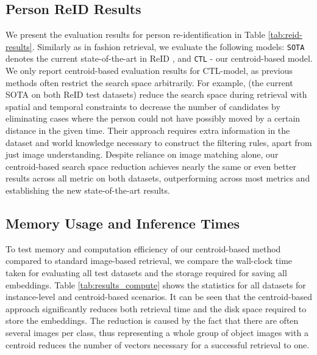 \documentclass[sigconf,nonacm]{acmart}
\begin{document}
\subsection{Person ReID Results}
We present the evaluation results for person re-identification in Table \ref{tab:reid-results}. Similarly as in fashion retrieval, we evaluate the following models: \texttt{SOTA} denotes the current state-of-the-art in ReID \cite{Wang2019_reid_spatial_temporal}, and \texttt{CTL} - our centroid-based model. We only report centroid-based evaluation results for CTL-model, as previous methods often restrict the search space arbitrarily.
For example, \cite{Wang2019_reid_spatial_temporal} (the current SOTA on both ReID test datasets) reduce the search space during retrieval with spatial and temporal constraints to decrease the number of candidates by eliminating cases where the person could not have possibly moved by a certain distance in the given time. Their approach requires extra information in the dataset and world knowledge necessary to construct the filtering rules, apart from just image understanding. Despite reliance on image matching alone, our centroid-based search space reduction achieves nearly the same or even better results across all metric on both datasets, outperforming \cite{Wang2019_reid_spatial_temporal} across most metrics and establishing the new state-of-the-art results.

\subsection{Memory Usage and Inference Times}

To test memory and computation efficiency of our centroid-based method compared to standard image-based retrieval, we compare the wall-clock time taken for evaluating all test datasets and the storage required for saving all embeddings.
Table \ref{tab:results_compute} shows the statistics for all datasets for instance-level and centroid-based scenarios. It can be seen that the centroid-based approach significantly reduces both retrieval time and the disk space required to store the embeddings. The reduction is caused by the fact that there are often several images per class, thus representing a whole group of object images with a centroid reduces the number of vectors necessary for a successful retrieval to one.
\end{document}
